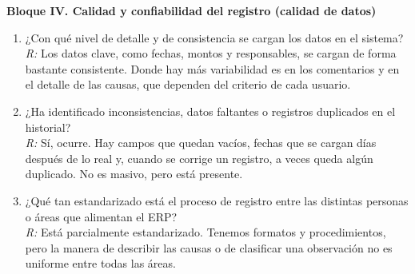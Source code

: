 \documentclass{univalle-perfil}
\begin{document}
\noindent\textbf{Bloque IV. Calidad y confiabilidad del registro (calidad de datos)}
\begin{enumerate}\setlength{\itemsep}{6pt}\setlength{\parskip}{0pt}
  \item ¿Con qué nivel de detalle y de consistencia se cargan los datos en el sistema?\\
  \textit{R:} Los datos clave, como fechas, montos y responsables, se cargan de forma bastante consistente. Donde hay más variabilidad es en los comentarios y en el detalle de las causas, que dependen del criterio de cada usuario.

  \item ¿Ha identificado inconsistencias, datos faltantes o registros duplicados en el historial?\\
  \textit{R:} Sí, ocurre. Hay campos que quedan vacíos, fechas que se cargan días después de lo real y, cuando se corrige un registro, a veces queda algún duplicado. No es masivo, pero está presente.

  \item ¿Qué tan estandarizado está el proceso de registro entre las distintas personas o áreas que alimentan el ERP?\\
  \textit{R:} Está parcialmente estandarizado. Tenemos formatos y procedimientos, pero la manera de describir las causas o de clasificar una observación no es uniforme entre todas las áreas.
\end{enumerate}
\end{document}
